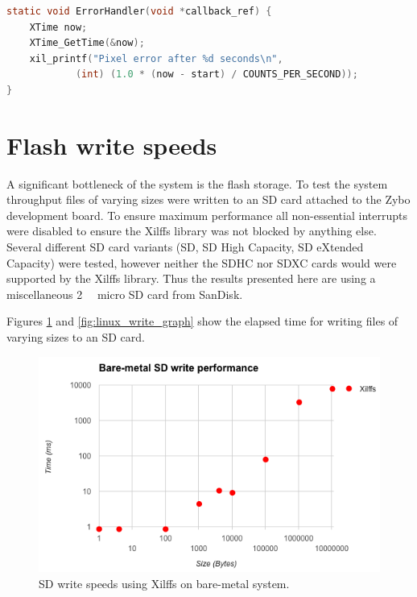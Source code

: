 \begin{lstlisting}[caption={Interrupt handler for bit pattern error.}, label={lst:pattern_error}, language=C]
static void ErrorHandler(void *callback_ref) {
    XTime now;
    XTime_GetTime(&now);
    xil_printf("Pixel error after %d seconds\n",
            (int) (1.0 * (now - start) / COUNTS_PER_SECOND));
}
\end{lstlisting}


\section{Flash write speeds}

A significant bottleneck of the system is the flash storage. To test the system throughput files of varying sizes were written to an SD card attached to the Zybo development board. To ensure maximum performance all non-essential interrupts were disabled to ensure the Xilffs library was not blocked by anything else. Several different SD card variants (SD, SD High Capacity, SD eXtended Capacity) were tested, however neither the SDHC nor SDXC cards would were supported by the Xilffs library. Thus the results presented here are using a miscellaneous \SI{2}{\giga\byte} micro SD card from SanDisk.

Figures \ref{fig:standalone_write_graph} and \ref{fig:linux_write_graph} show the elapsed time for writing files of varying sizes to an SD card. 

\begin{figure}
  \centering
  \includegraphics[width=1\textwidth]{./img/standalone_write_graph.png}
  \caption{SD write speeds using Xilffs on bare-metal system.}
  \label{fig:standalone_write_graph}
\end{figure}

